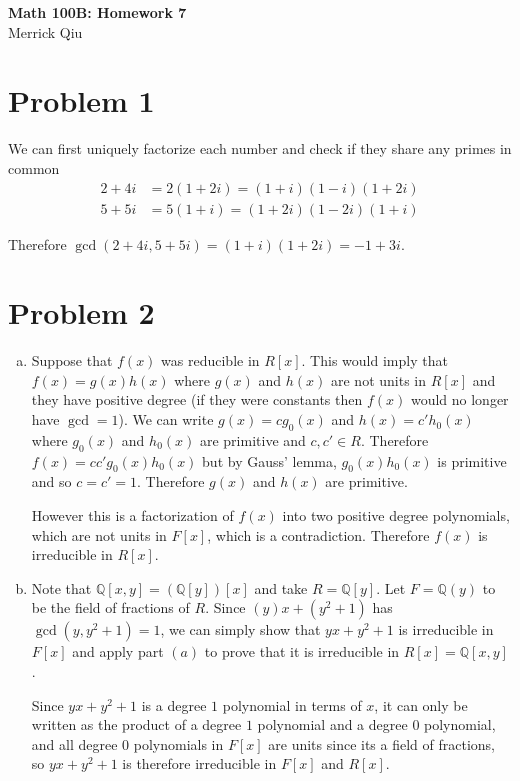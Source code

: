\documentclass{article}
\begin{document}
\begin{center}
	\huge{\bf Math 100B: Homework 7} \\
	Merrick Qiu
\end{center}

\section*{Problem 1}
We can first uniquely factorize each number
and check if they share any primes in common
\begin{align*}
    2+4i &= 2(1+2i) = (1+i)(1-i)(1+2i) \\
    5+5i &= 5(1+i) = (1+2i)(1-2i)(1+i) 
\end{align*}


Therefore $\gcd(2+4i, 5+5i) = (1+i)(1+2i) = -1+3i$. 
\newpage 

\section*{Problem 2}
\begin{enumerate}[(a)]
    \item Suppose that $f(x)$ was reducible in $R[x]$.
    This would imply that $f(x)=g(x)h(x)$ where $g(x)$ and $h(x)$ are 
    not units in $R[x]$ and they have positive degree
    (if they were constants then $f(x)$ would no longer have $\gcd = 1$).
    We can write $g(x) = cg_0(x)$ and $h(x) = c'h_0(x)$ where 
    $g_0(x)$ and $h_0(x)$ are primitive and $c,c' \in R$.
    Therefore $f(x) = cc'g_0(x)h_0(x)$ but by Gauss' lemma,
    $g_0(x)h_0(x)$ is primitive and so $c=c'=1$.
    Therefore $g(x)$ and $h(x)$ are primitive.

    However this is a factorization of $f(x)$ into 
    two positive degree polynomials, which are not units in $F[x]$,
    which is a contradiction.
    Therefore $f(x)$ is irreducible in $R[x]$.

    \item Note that $\mathbb{Q}[x,y] = (\mathbb{Q}[y])[x]$ and take
    $R = \mathbb{Q}[y]$. Let $F =\mathbb{Q}(y)$ to be the field of fractions of $R$.
    Since $(y)x + (y^2+1)$ has $\gcd(y, y^2+1) = 1$, we can simply show that 
    $yx+y^2+1$ is irreducible in $F[x]$ and apply part $(a)$ to prove that it 
    is irreducible in $R[x] = \mathbb{Q}[x,y]$. 
    
    Since $yx+y^2+1$ is a degree $1$ polynomial in terms of $x$,
    it can only be written as the product of a degree $1$ polynomial and a degree $0$ polynomial,
    and all degree $0$ polynomials in $F[x]$ are units since its a field of fractions,
    so $yx+y^2+1$ is therefore irreducible in $F[x]$ and $R[x]$.
\end{enumerate}
\newpage 
\end{document}

